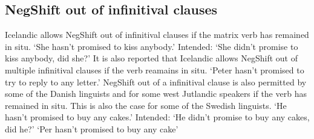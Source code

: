 \documentclass[12pt, letterpaper]{article}
\begin{document}
\subsection{NegShift out of infinitival clauses}

 \ea Icelandic allows NegShift out of infinitival clauses if the matrix verb has remained in situ.
	\glt `She hasn't promised to kiss anybody.'
	\glt Intended: `She didn't promise to kiss anybody, did she?'
	\z 
\ex It is also reported that Icelandic allows NegShift out of multiple infinitival clauses if the verb reamains in situ.
	\glt`Peter hasn't promised to try to reply to any letter.'
	\z 
\ex NegShift out of a infinitival clause is also permitted by some of the Danish linguists and for some west Jutlandic speakers if the verb has remained in situ. This is also the case for some of the Swedish linguists.
	\glt`He hasn't promised to buy any cakes.'
	\glt Intended: `He didn't promise to buy any cakes, did he?'
 	\glt `Per hasn't promised to buy any cake'
\end{document}
